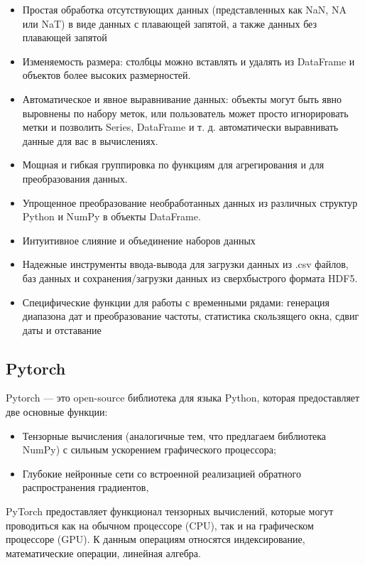 \begin{itemize}
	\item Простая обработка отсутствующих данных (представленных как NaN, NA или NaT) в виде данных с плавающей запятой, а также данных без плавающей запятой
	\item Изменяемость размера: столбцы можно вставлять и удалять из DataFrame и объектов более высоких размерностей.
	\item Автоматическое и явное выравнивание данных: объекты могут быть явно выровнены по набору меток, или пользователь может просто игнорировать метки и позволить Series, DataFrame и т. д. автоматически выравнивать данные для вас в вычислениях.
	\item Мощная и гибкая группировка по функциям для агрегирования и для преобразования данных.
	\item Упрощенное преобразование необработанных данных из различных структур Python и NumPy в объекты DataFrame.
	\item Интуитивное слияние и объединение наборов данных
	\item Надежные инструменты ввода-вывода для загрузки данных из .csv файлов, баз данных и сохранения/загрузки данных из сверхбыстрого формата HDF5.
	\item Специфические функции для работы с временными рядами: генерация диапазона дат и преобразование частоты, статистика скользящего окна, сдвиг даты и отставание
\end{itemize}

\subsection{Pytorch}

Pytorch --- это open-source библиотека для языка Python, которая предоставляет две основные функции:
\begin{itemize}
	\item Тензорные вычисления (аналогичные тем, что предлагаем библиотека NumPy) с сильным ускорением графического процессора;
	\item Глубокие нейронные сети со встроенной реализацией обратного распространения градиентов,
\end{itemize}

PyTorch предоставляет функционал тензорных вычислений, которые могут проводиться как на обычном процессоре (CPU), так и на графическом процессоре (GPU). К данным операциям относятся индексирование, математические операции, линейная алгебра.

